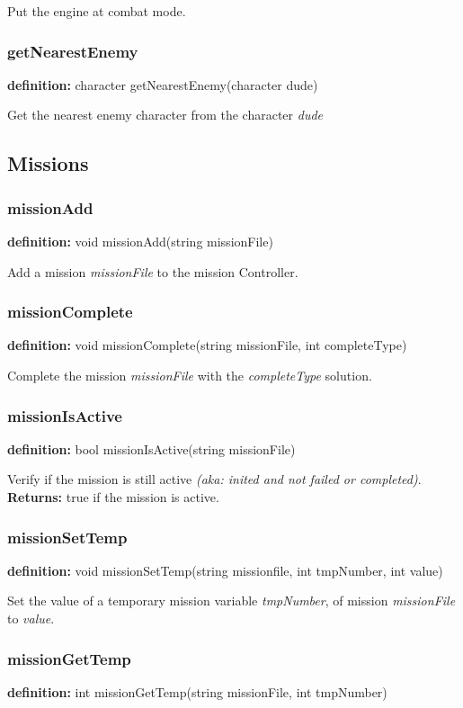 \documentclass[ letterpaper,12pt]{article}
\begin{document}
Put the engine at combat mode.

\subsubsection{getNearestEnemy}
{\bf definition:} character getNearestEnemy(character dude)

Get the nearest enemy character from the character {\it dude}


\subsection{Missions}

\subsubsection{missionAdd}
{\bf definition:} void missionAdd(string missionFile)

Add a mission {\it missionFile} to the mission Controller.

\subsubsection{missionComplete}
{\bf definition:} void missionComplete(string missionFile, int completeType)

Complete the mission {\it missionFile} with the {\it completeType} solution.

\subsubsection{missionIsActive}
{\bf definition:} bool missionIsActive(string missionFile)

Verify if the mission is still active {\it (aka: inited and not failed or
completed)}. {\bf Returns: } true if the mission is active.

\subsubsection{missionSetTemp}
{\bf definition:} void missionSetTemp(string missionfile, int tmpNumber, int value)

Set the value of a temporary mission variable {\it tmpNumber}, of mission {\it
missionFile} to {\it value}.


\subsubsection{missionGetTemp}
{\bf definition:} int missionGetTemp(string missionFile, int tmpNumber)
\end{document}

